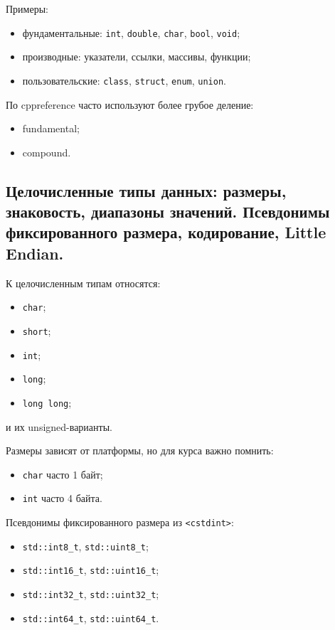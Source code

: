 Примеры:
\begin{itemize}
    \item фундаментальные: \texttt{int}, \texttt{double}, \texttt{char}, \texttt{bool}, \texttt{void};
    \item производные: указатели, ссылки, массивы, функции;
    \item пользовательские: \texttt{class}, \texttt{struct}, \texttt{enum}, \texttt{union}.
\end{itemize}

По cppreference часто используют более грубое деление:
\begin{itemize}
    \item fundamental;
    \item compound.
\end{itemize}


\subsection{Целочисленные типы данных: размеры, знаковость, диапазоны значений. Псевдонимы фиксированного размера, кодирование, Little Endian.}

К целочисленным типам относятся:
\begin{itemize}
    \item \texttt{char};
    \item \texttt{short};
    \item \texttt{int};
    \item \texttt{long};
    \item \texttt{long long};
\end{itemize}
и их unsigned-варианты.

Размеры зависят от платформы, но для курса важно помнить:
\begin{itemize}
    \item \texttt{char} часто 1 байт;
    \item \texttt{int} часто 4 байта.
\end{itemize}

Псевдонимы фиксированного размера из \texttt{<cstdint>}:
\begin{itemize}
    \item \texttt{std::int8\_t}, \texttt{std::uint8\_t};
    \item \texttt{std::int16\_t}, \texttt{std::uint16\_t};
    \item \texttt{std::int32\_t}, \texttt{std::uint32\_t};
    \item \texttt{std::int64\_t}, \texttt{std::uint64\_t}.
\end{itemize}


